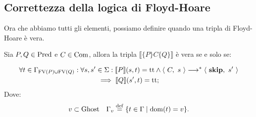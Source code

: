 \subsection{Correttezza della logica di Floyd-Hoare}
Ora che abbiamo tutti gli elementi, possiamo definire quando una tripla di Floyd-Hoare è vera.

\begin{definizione} 
Sia $P,Q \in \mathrm{Pred}$ e $C \in \mathrm{Com}$, allora la tripla
$\llbracket \{P\} C\{Q\} \rrbracket$ è vera se e solo se:

\begin{multline*}
       \forall t \in \Gamma_{\mathrm{FV}(P) \cup \mathrm{FV}(Q)} \mathrel{:} 
       \forall  s,s'\in \Sigma \mathrel{:} \llbracket P \rrbracket(s,t) = \mathrm{tt}
       \land \langle\ C,\ s\ \rangle \longrightarrow ^*\langle\ \mathop{\textup{\textbf{skip}}},\ s'\ \rangle\\
       \implies \llbracket Q \rrbracket(s',t)=\mathrm{tt};
\end{multline*}
Dove:
\[
   v \subset \Ghost \quad \Gamma_{v} \defeq \{t \in \Gamma \mid \dom(t) = v \}.
\]
\end{definizione}

